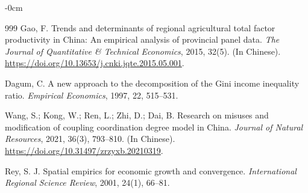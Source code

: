 \documentclass[sustainability,article,submit,moreauthors]{Definitions/mdpi}
\numberwithin{equation}{section}
\begin{document}
\begin{adjustwidth}{-\extralength}{0cm}
\begin{thebibliography}{999}
 Gao, F. Trends and determinants of regional agricultural total factor productivity in China: An empirical analysis of provincial panel data. \textit{The Journal of Quantitative \& Technical Economics}, 2015, 32(5). (In Chinese). \url{https://doi.org/10.13653/j.cnki.jqte.2015.05.001}.

 Dagum, C. A new approach to the decomposition of the Gini income inequality ratio. \textit{Empirical Economics}, 1997, 22, 515--531.

 Wang, S.; Kong, W.; Ren, L.; Zhi, D.; Dai, B. Research on misuses and modification of coupling coordination degree model in China. \textit{Journal of Natural Resources}, 2021, 36(3), 793--810. (In Chinese). \url{https://doi.org/10.31497/zrzyxb.20210319}.

 Rey, S. J. Spatial empirics for economic growth and convergence. \textit{International Regional Science Review}, 2001, 24(1), 66--81.
\end{thebibliography}
\end{adjustwidth}
\end{document}
